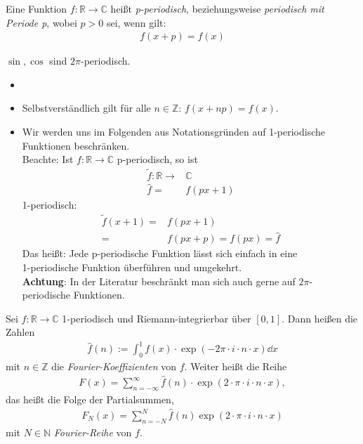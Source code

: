\begin{Definition}{
	Eine Funktion $f: \mathbb{R} \rightarrow \mathbb{C}$ heißt \emph{p-periodisch}, 
	beziehungsweise \emph{periodisch mit Periode p}, wobei $p > 0$ sei, wenn gilt:
	\begin{align*}
		f(x+p) = f(x)
	\end{align*}
}\end{Definition}

\begin{Beispiel}{
	$\sin, \cos$ sind $2\pi$-periodisch.
}\end{Beispiel}

\begin{Bemerkung}{
\begin{itemize}
	\item[ ]
	\item Selbstverständlich gilt für alle $n \in \mathbb{Z}$: $f(x + np) = f(x)$.
	\item Wir werden uns im Folgenden aus Notationsgründen auf 1-periodische 
	Funktionen beschränken. \\
	Beachte: Ist $f: \mathbb{R} \rightarrow \mathbb{C}$ p-periodisch, so ist 
	\begin{align*}
		\tilde{f}: \mathbb{R} \rightarrow & \mathbb{C}\\
		 \hat{f} = & f(px +1)
	\end{align*}
	1-periodisch: 
	\begin{align*}
		\tilde{f}(x+1) = & f(px + 1) \\ = & f(px + p) = f(px) = \hat{f}
	\end{align*}
	Das heißt: Jede p-periodische Funktion lässt sich einfach in eine \\
	1-periodische 
	Funktion überführen und umgekehrt. \\
	\textbf{Achtung}: In der Literatur beschränkt man sich auch gerne auf $2\pi$-
	periodische Funktionen.
\end{itemize}
}\end{Bemerkung}

\begin{Definition}{
	Sei $f: \mathbb{R} \rightarrow \mathbb{C}$ 1-periodisch und Riemann-integrierbar 
	über $[0,1]$. Dann heißen die Zahlen
	\begin{align*}
		\hat{f}(n) := \int_0^1 f(x) \cdot \exp(-2\pi \cdot i \cdot n \cdot x) \dd{x}
	\end{align*}
	mit $n \in \mathbb{Z}$ die \emph{Fourier-Koeffizienten} von $f$. Weiter 
	heißt die Reihe 
	\begin{align*}
		F(x) = \sum_{n = -\infty}^{\infty} \hat{f}(n) \cdot \exp\left( 
		2 \cdot \pi \cdot i \cdot n \cdot x\right),
	\end{align*}
	das heißt die Folge der Partialsummen,
	\begin{align*}
		F_N(x)= \sum_{n = -N}^N \hat{f}(n) \exp\left( 
		2 \cdot \pi \cdot i \cdot n \cdot x\right)
	\end{align*}
	mit $N \in \mathbb{N}$ \emph{Fourier-Reihe} von $f$.
}\end{Definition}

